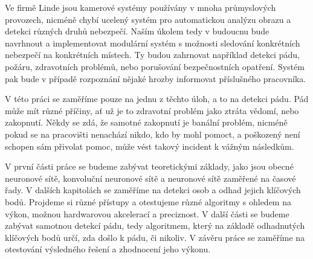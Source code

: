 Ve firmě Linde jsou kamerové systémy používány v mnoha průmyslových provozech,
nicméně chybí ucelený systém pro automatickou analýzu obrazu a detekci různých
druhů nebezpečí. Naším úkolem tedy v budoucnu bude navrhnout a implementovat
modulární systém s možnosti sledování konkrétních nebezpečí na konkrétních
místech. Ty budou zahrnovat například detekci pádu, požáru, zdravotních problémů,
nebo porušování bezpečnostních opatření. Systém pak bude v případě rozpoznání
nějaké hrozby informovat příslušného pracovníka.

V této práci se zaměříme pouze na jednu z těchto úloh, a to na detekci pádu.
Pád může mít různé příčiny, ať už je to zdravotní problém jako ztráta vědomí,
nebo zakopnutí. Někdy se zdá, že samotné zakopnutí je banální problém, nicméně
pokud se na pracovišti nenachází nikdo, kdo by mohl pomoct, a poškozený není
schopen sám přivolat pomoc, může vést takový incident k vážným následkům.

V první části práce se budeme zabývat teoretickými základy, jako jsou obecné
neuronové sítě, konvoluční neuronové sítě a neuronové sítě zaměřené na časové
řady. V dalších kapitolách se zaměříme na detekci osob a odhad jejich klíčových
bodů. Projdeme si různé přístupy a otestujeme různé algoritmy s ohledem na
výkon, možnou hardwarovou akcelerací a preciznost. V další části se budeme
zabývat samotnou detekcí pádu, tedy algoritmem, který na základě odhadnutých
klíčových bodů určí, zda došlo k pádu, či nikoliv. V závěru práce se zaměříme
na otestování výsledného řešení a zhodnocení jeho výkonu.

\endinput